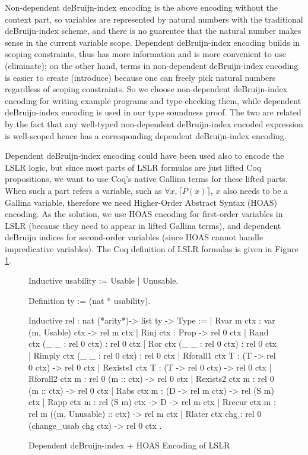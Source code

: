 \documentclass[preprint]{sigplanconf}
\begin{document}
Non-dependent deBruijn-index encoding is the above encoding without the context part, so variables are represented by natural numbers with the traditional deBruijn-index scheme, and there is no guarentee that the natural number makes sense in the current variable scope. Dependent deBruijn-index encoding builds in scoping constraints, thus has more information and is more convenient to use (eliminate); on the other hand, terms in non-dependent deBruijn-index encoding is easier to create (introduce) because one can freely pick natural numbers regardless of scoping constraints. So we choose non-dependent deBruijn-index encoding for writing example programs and type-checking them, while dependent deBruijn-index encoding is used in our type soundness proof. The two are related by the fact that any well-typed non-dependent deBruijn-index encoded expression is well-scoped hence has a corresponding dependent deBruijn-index encoding.

Dependent deBruijn-index encoding could have been used also to encode the LSLR logic, but since most parts of LSLR formulas are just lifted Coq propositions, we want to use Coq's native Gallina terms for these lifted parts. When such a part refers a variable, such as $\forall x,\lceil P(x)\rceil$, $x$ also needs to be a Gallina variable, therefore we need Higher-Order Abstract Syntax (HOAS) encoding. As the solution, we use HOAS encoding for first-order variables in LSLR (because they need to appear in lifted Gallina terms), and dependent deBruijn indices for second-order variables (since HOAS cannot handle impredicative variables). The Coq definition of LSLR formulas is given in Figure \ref{coq-lslr}.

\begin{figure}
\begin{coq}
Inductive usability := Usable | Unusable.

Definition ty := (nat * usability).

Inductive rel : nat (*arity*)-> list ty -> Type :=
| Rvar {m ctx} : var (m, Usable) ctx -> rel m ctx
| Rinj {ctx} : Prop -> rel 0 ctx
| Rand {ctx} (_ _ : rel 0 ctx) : rel 0 ctx
| Ror {ctx} (_ _ : rel 0 ctx) : rel 0 ctx
| Rimply {ctx} (_ _ : rel 0 ctx) : rel 0 ctx
| Rforall1 {ctx T} : (T -> rel 0 ctx) -> rel 0 ctx
| Rexists1 {ctx T} : (T -> rel 0 ctx) -> rel 0 ctx
| Rforall2 {ctx m} : rel 0 (m :: ctx) -> rel 0 ctx
| Rexists2 {ctx m} : rel 0 (m :: ctx) -> rel 0 ctx
| Rabs {ctx m} : (D -> rel m ctx) -> rel (S m) ctx
| Rapp {ctx m} : rel (S m) ctx -> D -> rel m ctx
| Rrecur {ctx m} : rel m ((m, Unusable) :: ctx) -> rel m ctx
| Rlater {ctx} chg : rel 0 (change_usab chg ctx) -> rel 0 ctx
.
\end{coq}
\caption{\label{coq-lslr}Dependent deBruijn-index + HOAS Encoding of LSLR}
\end{figure}
\end{document}
